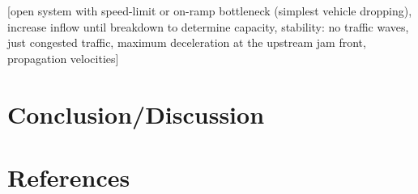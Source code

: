 \documentclass[review]{elsarticle}
\begin{document}
[open system with speed-limit or on-ramp bottleneck (simplest vehicle
  dropping), increase inflow until breakdown to determine capacity,
  stability: no traffic waves, just congested traffic, maximum
  deceleration at the upstream jam front, propagation velocities]


\section{Conclusion/Discussion}

\section*{References}


\end{document}

